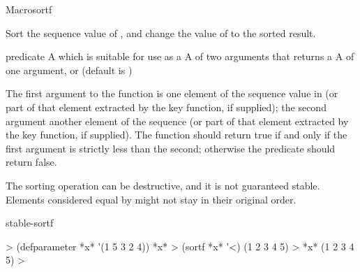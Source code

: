 \documentclass[10pt,twoside,english,pdftex]{article}
\begin{document}
\begin{functiondoc}{Macro}{sortf}{
    }
%

\fnsyntax

\fnpurpose Sort the sequence value of , and change the value of
 to the sorted result.

\fnpackage {}

\fnmodule {}

\fnargs
\begin{args}{predicate}
\arg[place] A  which is suitable for use as a 
\arg[predicate] A  of two arguments that returns a
\arg[key] A  of one argument, or \nil{} (default is \nil)
\end{args}

\fndescription
%
The first argument to the  function is one element of the
sequence value in  (or part of that element extracted by the key
function, if supplied); the second argument another element of the sequence
(or part of that element extracted by the key function, if supplied). The
 function should return true if and only if the first
argument is strictly less than the second; otherwise the predicate should
return false.

The sorting operation can be destructive, and it is not guaranteed
stable. Elements considered equal by  might not stay in their
original order.

\begin{alsos}{stable-sortf}
\end{alsos}

\fnexample
\begin{example}
%
\W\supp
  > (defparameter *x* '(1 5 3 2 4))
  *x*
  > (sortf *x* '<)
  (1 2 3 4 5)
  > *x*
  (1 2 3 4 5)
  >
\end{example}

\end{functiondoc}

\end{document}
